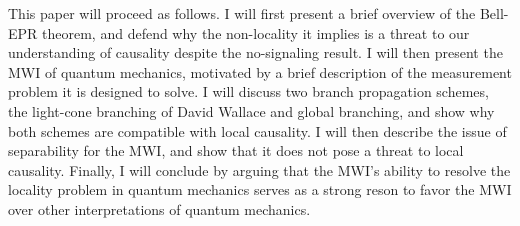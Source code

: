 This paper will proceed as follows. I will first present a brief overview of 
the Bell-EPR theorem, and defend why the non-locality it implies is a threat to
our understanding of causality despite the no-signaling result. I will then
present the MWI of quantum mechanics, motivated by a brief description of the
measurement problem it is designed to solve. I will discuss two branch
propagation schemes, the light-cone branching of David Wallace and global
branching, and show why both schemes are compatible with local causality. I will
then describe the issue of separability for the MWI, and show that it does not
pose a threat to local causality. Finally, I will conclude by arguing that the
MWI's ability to resolve the locality problem in quantum mechanics serves as a
strong reson to favor the MWI over other interpretations of quantum mechanics.

